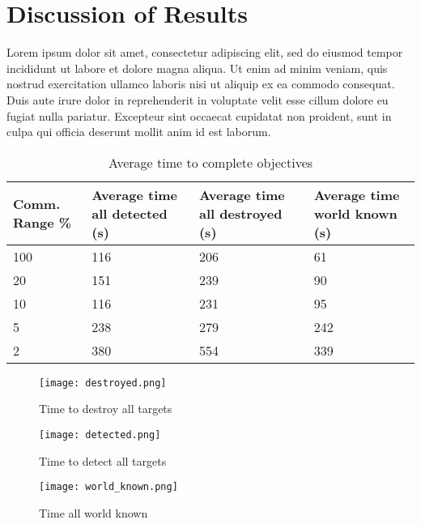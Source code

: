 \chapter{Discussion of Results}
Lorem ipsum dolor sit amet, consectetur adipiscing elit, sed do eiusmod tempor incididunt ut labore et dolore magna aliqua. Ut enim ad minim veniam, quis nostrud exercitation ullamco laboris nisi ut aliquip ex ea commodo consequat. Duis aute irure dolor in reprehenderit in voluptate velit esse cillum dolore eu fugiat nulla pariatur. Excepteur sint occaecat cupidatat non proident, sunt in culpa qui officia deserunt mollit anim id est laborum.


\begin{table}[h]
	\caption{Average time to complete objectives}
	\centering
	\label{tab:avgResults}
		\begin{tabular}{|p{1.25cm}|p{1.5cm}|p{1.75cm}|p{1.5cm}|}
		\hline
		Comm. Range \% & Average time all detected (s) & Average time all destroyed (s) & Average time world known (s)\\
		\hline
			100 & 116 & 206 & 61  \\ \hline
			 20 & 151 & 239 & 90  \\ \hline
			 10 & 116 & 231 & 95  \\ \hline
			  5 & 238 & 279 & 242 \\ \hline
			  2 & 380 & 554 & 339 \\ \hline
	\end{tabular}
\end{table}

\begin{figure}[h]
	\centering
	\texttt{[image: destroyed.png]}
	\caption{Time to destroy all targets}
	\label{fig:time_to_destroy}
\end{figure}

\begin{figure}[h]
	\centering
	\texttt{[image: detected.png]}
	\caption{Time to detect all targets}
	\label{fig:time_to_detect}
\end{figure}

\begin{figure}[h]
	\centering
	\texttt{[image: world\_known.png]}
	\caption{Time all world known}
	\label{fig:time_all_world_known}
\end{figure}
